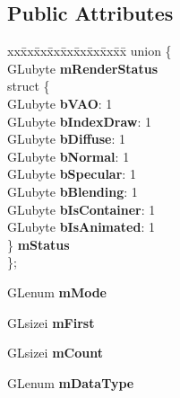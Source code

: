 \subsection*{Public Attributes}
\begin{DoxyCompactItemize}
\item 
\begin{tabbing}
xx\=xx\=xx\=xx\=xx\=xx\=xx\=xx\=xx\=\kill
union \{\\
\>GLubyte {\bfseries mRenderStatus}\\
\>struct \{\\
\>\>GLubyte {\bfseries bVAO}: 1\\
\>\>GLubyte {\bfseries bIndexDraw}: 1\\
\>\>GLubyte {\bfseries bDiffuse}: 1\\
\>\>GLubyte {\bfseries bNormal}: 1\\
\>\>GLubyte {\bfseries bSpecular}: 1\\
\>\>GLubyte {\bfseries bBlending}: 1\\
\>\>GLubyte {\bfseries bIsContainer}: 1\\
\>\>GLubyte {\bfseries bIsAnimated}: 1\\
\>\} {\bfseries mStatus}\\
\}; \hypertarget{structflw_1_1flf_1_1RenderItem_ad06d37e58fdbc631f514e94535578136}{}\label{structflw_1_1flf_1_1RenderItem_ad06d37e58fdbc631f514e94535578136}
\\

\end{tabbing}\item 
G\+Lenum {\bfseries m\+Mode}\hypertarget{structflw_1_1flf_1_1RenderItem_a4e7932d1ecf952ceb556aeccf311178a}{}\label{structflw_1_1flf_1_1RenderItem_a4e7932d1ecf952ceb556aeccf311178a}

\item 
G\+Lsizei {\bfseries m\+First}\hypertarget{structflw_1_1flf_1_1RenderItem_a17b5fabb005ace813c2514cf5c50fcfa}{}\label{structflw_1_1flf_1_1RenderItem_a17b5fabb005ace813c2514cf5c50fcfa}

\item 
G\+Lsizei {\bfseries m\+Count}\hypertarget{structflw_1_1flf_1_1RenderItem_a925ea582099a60e28adc726f286d1e20}{}\label{structflw_1_1flf_1_1RenderItem_a925ea582099a60e28adc726f286d1e20}

\item 
G\+Lenum {\bfseries m\+Data\+Type}\hypertarget{structflw_1_1flf_1_1RenderItem_a0f2abbeab716701b3e34ff0093bb31bc}{}\label{structflw_1_1flf_1_1RenderItem_a0f2abbeab716701b3e34ff0093bb31bc}


\end{DoxyCompactItemize}

